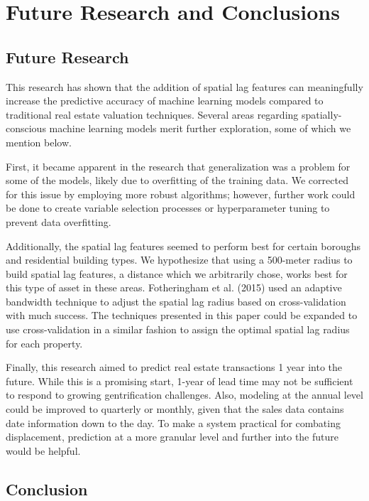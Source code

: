 \documentclass[conference,final,]{IEEEtran}
\begin{document}
\hypertarget{future-research-and-conclusions}{%
\section{Future Research and
Conclusions}\label{future-research-and-conclusions}}

\hypertarget{future-research}{%
\subsection{Future Research}\label{future-research}}

This research has shown that the addition of spatial lag features can
meaningfully increase the predictive accuracy of machine learning models
compared to traditional real estate valuation techniques. Several areas
regarding spatially-conscious machine learning models merit further
exploration, some of which we mention below.

First, it became apparent in the research that generalization was a
problem for some of the models, likely due to overfitting of the
training data. We corrected for this issue by employing more robust
algorithms; however, further work could be done to create variable
selection processes or hyperparameter tuning to prevent data
overfitting.

Additionally, the spatial lag features seemed to perform best for
certain boroughs and residential building types. We hypothesize that
using a 500-meter radius to build spatial lag features, a distance which
we arbitrarily chose, works best for this type of asset in these areas.
Fotheringham et al. (2015) used an adaptive bandwidth technique to
adjust the spatial lag radius based on cross-validation with much
success. The techniques presented in this paper could be expanded to use
cross-validation in a similar fashion to assign the optimal spatial lag
radius for each property.

Finally, this research aimed to predict real estate transactions 1 year
into the future. While this is a promising start, 1-year of lead time
may not be sufficient to respond to growing gentrification challenges.
Also, modeling at the annual level could be improved to quarterly or
monthly, given that the sales data contains date information down to the
day. To make a system practical for combating displacement, prediction
at a more granular level and further into the future would be helpful.

\hypertarget{conclusion}{%
\subsection{Conclusion}\label{conclusion}}
\end{document}
